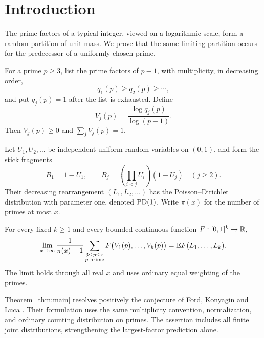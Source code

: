 \section{Introduction}\label{sec:intro}

The prime factors of a typical integer, viewed on a logarithmic
scale, form a random partition of unit mass.  We prove that the same
limiting partition occurs for the predecessor of a uniformly chosen
prime.

For a prime $p\ge3$, list the prime factors of $p-1$, with
multiplicity, in decreasing order,
\[
 q_1(p)\ge q_2(p)\ge\cdots,
\]
and put $q_j(p)=1$ after the list is exhausted.  Define
\[
 V_j(p)=\frac{\log q_j(p)}{\log(p-1)}.
\]
Then $V_j(p)\ge0$ and $\sum_jV_j(p)=1$.

Let $U_1,U_2,\ldots$ be independent uniform random variables on
$(0,1)$, and form the stick fragments
\begin{equation}\label{eq:stick-breaking}
 B_1=1-U_1,
 \qquad B_j=\left(\prod_{i<j}U_i\right)(1-U_j)
       \quad(j\ge2).
\end{equation}
Their decreasing rearrangement $(L_1,L_2,\ldots)$ has the
Poisson--Dirichlet distribution with parameter one, denoted
$\operatorname{PD}(1)$. Write $\pi(x)$ for the number of primes at most $x$.

\begin{theorem}\label{thm:main}
For every fixed $k\ge1$ and every bounded continuous function
$F:[0,1]^k\to\mathbb R$,
\begin{equation}\label{eq:main-law}
 \lim_{x\to\infty}\frac1{\pi(x)-1}
     \sum_{\substack{3\le p\le x\\p\text{ prime}}}
       F\bigl(V_1(p),\ldots,V_k(p)\bigr)
 =\mathbb E F(L_1,\ldots,L_k).
\end{equation}
The limit holds through all real $x$ and uses ordinary equal
weighting of the primes.
\end{theorem}

Theorem~\ref{thm:main} resolves positively the conjecture of Ford,
Konyagin and Luca \cite[Section~6, Conjecture~5]{FordKonyaginLuca2010}.
Their formulation uses the same multiplicity convention, normalization,
and ordinary counting distribution on primes. The assertion includes
all finite joint distributions, strengthening the largest-factor
prediction alone.


